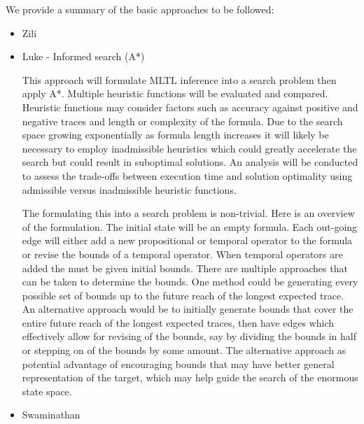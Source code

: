\documentclass[12pt]{article}
\begin{document}
We provide a summary of the basic approaches to be followed:
\begin{itemize}
    \item Zili
    \item Luke - Informed search (A*)

This approach will formulate MLTL inference into a search problem then apply A*.  Multiple heuristic functions will be evaluated and compared.  Heuristic functions may consider factors such as accuracy against positive and negative traces and length or complexity of the formula.  Due to the search space growing exponentially as formula length increases it will likely be necessary to employ inadmissible heuristics which could greatly accelerate the search but could result in suboptimal solutions.  An analysis will be conducted to assess the trade-offs between execution time and solution optimality using admissible versus inadmissible heuristic functions. 

The formulating this into a search problem is non-trivial. Here is an overview of the formulation. The initial state will be an empty formula. Each out-going edge will either add a new propositional or temporal operator to the formula or revise the bounds of a temporal operator.  When temporal operators are added the must be given initial bounds. There are multiple approaches that can be taken to determine the bounds. One method could be generating every possible set of bounds up to the future reach of the longest expected trace. An alternative approach would be to initially generate bounds that cover the entire future reach of the longest expected traces, then have edges which effectively allow for revising of the bounds, say by dividing the bounds in half or stepping on of the bounds by some amount. The alternative approach as potential advantage of encouraging bounds that may have better general representation of the target, which may help guide the search of the enormous state space.
    \item Swaminathan
    

\end{itemize}
\end{document}
